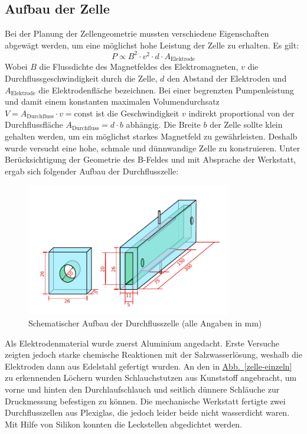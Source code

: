 \documentclass[11pt]{scrartcl}
\newcommand{\abb}[1]{\hyperref[#1]{Abb.~\ref{#1}}}
\begin{document}
\subsection{Aufbau der Zelle}			%
Bei der Planung der Zellengeometrie mussten verschiedene Eigenschaften abgewägt werden, um eine möglichst hohe Leistung der Zelle zu erhalten.
Es gilt:
\[
P \propto B^2 \cdot v^2 \cdot d \cdot A_{\text{Elektrode}}
\]
Wobei $B$ die Flussdichte des Magnetfeldes des Elektromagneten, $v$ die Durchflussgeschwindigkeit durch die Zelle, $d$ den Abstand der Elektroden und $A_{\text{Elektrode}}$ die Elektrodenfläche bezeichnen. 
Bei einer begrenzten Pumpenleistung und damit einem konstanten maximalen Volumendurchsatz $V=A_{\text{Durchfluss}} \cdot v=\text{const}$ ist die Geschwindigkeit $v$ indirekt proportional von der Durchflussfläche $A_{\text{Durchfluss}} = d \cdot b$ abhängig.
Die Breite $b$ der Zelle sollte klein gehalten werden, um ein möglichst starkes Magnetfeld zu gewährleisten. Deshalb wurde versucht eine hohe, schmale und dünnwandige Zelle zu konstruieren.
Unter Berücksichtigung der Geometrie des B-Feldes und mit Absprache der Werkstatt, ergab sich folgender Aufbau der Durchflusszelle:

\begin{figure}[ht]
\begin{center}
\includegraphics[width=0.8\textwidth]{images/zelle-schema.pdf}
\end{center}
\vspace{-1.5\baselineskip}
\caption{Schematischer Aufbau der Durchflusszelle (alle Angaben in mm)}
\label{zelle-schema}
\end{figure}

Als Elektrodenmaterial wurde zuerst Aluminium angedacht. Erste Versuche zeigten jedoch starke chemische Reaktionen mit der Salzwasserlösung, weshalb die Elektroden dann aus Edelstahl gefertigt wurden. 
An den in \abb{zelle-einzeln} zu erkennenden Löchern wurden Schlauchstutzen aus Kunststoff angebracht, um vorne und hinten den Durchlaufschlauch und seitlich dünnere Schläuche zur Druckmessung befestigen zu können.
Die mechanische Werkstatt fertigte zwei Durchflusszellen aus Plexiglas, die jedoch leider beide nicht wasserdicht waren. Mit Hilfe von Silikon konnten die Leckstellen abgedichtet werden.
\end{document}
